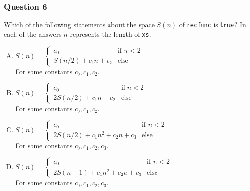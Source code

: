 \begin{frame}
	\frametitle{Question 6}
	
		\scriptsize
	Which of the following statements about the space $S(n)$ of \texttt{recfunc} is \textbf{true}? In each of the
	answers $n$ represents the length of \texttt{xs}.
	\begin{multicols}{2}
	\begin{enumerate}[A.]
		\scriptsize
		\item $S(n) = \begin{cases}
			c_0 & \text{if } n < 2\\
			S(n/2) + c_1n + c_2 & \text{else}
		\end{cases}$\\ For some constants $c_0, c_1, c_2$.
	\item $S(n) = \begin{cases}
			c_0 & \text{if } n < 2\\
			2S(n/2) + c_1n + c_2 & \text{else}
		\end{cases}$\\ For some constants $c_0, c_1, c_2$.
	\item $S(n) = \begin{cases}
			c_0 & \text{if } n < 2\\
			2S(n/2) + c_1n^2 + c_2n + c_3 & \text{else}
		\end{cases}$\\ For some constants $c_0, c_1, c_2, c_3$.
	\item $S(n) = \begin{cases}
			c_0 & \text{if } n < 2\\
			2S(n-1) + c_1n^2 + c_2n + c_3 & \text{else}
		\end{cases}$\\ For some constants $c_0, c_1, c_2, c_3$.
	\end{enumerate}
\end{multicols}
\end{frame}

	
